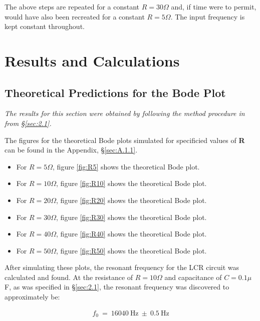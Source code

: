 \documentclass[12pt]{article}
\begin{document}
The above steps are repeated for a constant $R = 30 \Omega$ and, if time were to permit, would have also been recreated for a constant $R = 5 \Omega$. The input frequency is kept constant throughout.

\section{Results and Calculations}

\subsection{Theoretical Predictions for the Bode Plot} \label{sec:3.1}

\textit{The results for this section were obtained by following the method procedure in from §\ref{sec:2.1}.}

The figures for the theoretical Bode plots simulated for specificied values of \textbf{R} can be found in the Appendix, §\ref{sec:A.1.1}.

\begin{itemize}
    \item For $R = 5 \Omega$, figure \ref{fig:R5} shows the theoretical Bode plot.
    \item For $R = 10 \Omega$, figure \ref{fig:R10} shows the theoretical Bode plot.
    \item For $R = 20 \Omega$, figure \ref{fig:R20} shows the theoretical Bode plot.
    \item For $R = 30 \Omega$, figure \ref{fig:R30} shows the theoretical Bode plot.
    \item For $R = 40 \Omega$, figure \ref{fig:R40} shows the theoretical Bode plot.
    \item For $R = 50 \Omega$, figure \ref{fig:R50} shows the theoretical Bode plot.
\end{itemize}

\vspace{0.25cm}

After simulating these plots, the resonant frequency for the LCR circuit was calculated and found. At the resistance of $R = 10 \Omega$ and capacitance of $C = 0.1 \mu$F, as was
specified in §\ref{sec:2.1}, the resonant frequency was discovered to approximately be:

\begin{gather} \label{eq:15}
    f_0 \: = \: 16040 \: \text{Hz} \: \pm \: 0.5 \: \text{Hz}
\end{gather}
\end{document}
